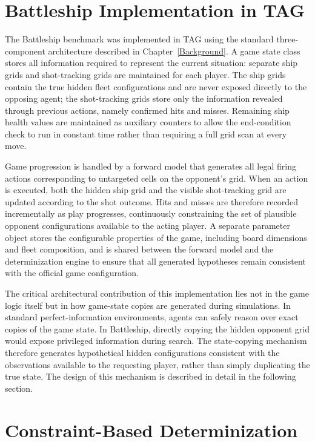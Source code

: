 \section{Battleship Implementation in TAG}
\label{sec:battleship_tag_impl}

The Battleship benchmark was implemented in TAG using the standard three-component architecture described in Chapter~\ref{Background}. A game state class stores all information required to represent the current situation: separate ship grids and shot-tracking grids are maintained for each player. The ship grids contain the true hidden fleet configurations and are never exposed directly to the opposing agent; the shot-tracking grids store only the information revealed through previous actions, namely confirmed hits and misses. Remaining ship health values are maintained as auxiliary counters to allow the end-condition check to run in constant time rather than requiring a full grid scan at every move.

Game progression is handled by a forward model that generates all legal firing actions corresponding to untargeted cells on the opponent's grid. When an action is executed, both the hidden ship grid and the visible shot-tracking grid are updated according to the shot outcome. Hits and misses are therefore recorded incrementally as play progresses, continuously constraining the set of plausible opponent configurations available to the acting player. A separate parameter object stores the configurable properties of the game, including board dimensions and fleet composition, and is shared between the forward model and the determinization engine to ensure that all generated hypotheses remain consistent with the official game configuration.

The critical architectural contribution of this implementation lies not in the game logic itself but in how game-state copies are generated during simulations. In standard perfect-information environments, agents can safely reason over exact copies of the game state. In Battleship, directly copying the hidden opponent grid would expose privileged information during search. The state-copying mechanism therefore generates hypothetical hidden configurations consistent with the observations available to the requesting player, rather than simply duplicating the true state. The design of this mechanism is described in detail in the following section.


\section{Constraint-Based Determinization}
\label{sec:constraint_det}

